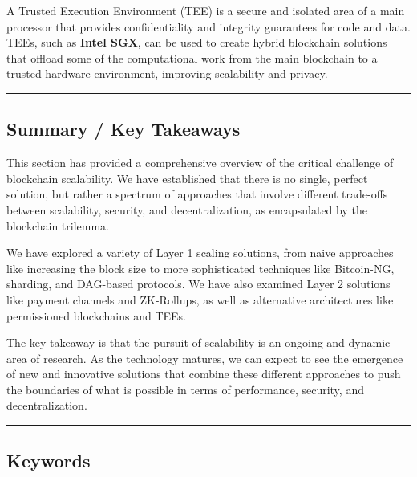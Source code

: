 A Trusted Execution Environment (TEE) is a secure and isolated area of a
main processor that provides confidentiality and integrity guarantees
for code and data. TEEs, such as \textbf{Intel SGX}, can be used to
create hybrid blockchain solutions that offload some of the
computational work from the main blockchain to a trusted hardware
environment, improving scalability and privacy.


\begin{center}\rule{0.5\linewidth}{0.5pt}\end{center}

\subsection{Summary / Key Takeaways}\label{summary-key-takeaways}

This section has provided a comprehensive overview of the critical
challenge of blockchain scalability. We have established that there is
no single, perfect solution, but rather a spectrum of approaches that
involve different trade-offs between scalability, security, and
decentralization, as encapsulated by the blockchain trilemma.

We have explored a variety of Layer 1 scaling solutions, from naive
approaches like increasing the block size to more sophisticated
techniques like Bitcoin-NG, sharding, and DAG-based protocols. We have
also examined Layer 2 solutions like payment channels and ZK-Rollups, as
well as alternative architectures like permissioned blockchains and
TEEs.

The key takeaway is that the pursuit of scalability is an ongoing and
dynamic area of research. As the technology matures, we can expect to
see the emergence of new and innovative solutions that combine these
different approaches to push the boundaries of what is possible in terms
of performance, security, and decentralization.

\begin{center}\rule{0.5\linewidth}{0.5pt}\end{center}

\subsection{Keywords}\label{keywords}

